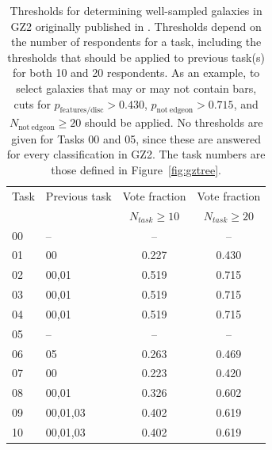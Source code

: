 \begin{table}[t]
\centering
 \begin{tabular*}{\textwidth}{l@{\extracolsep{\fill}}lcc}
 \hline
\multicolumn{1}{l}{Task} &
\multicolumn{1}{l}{Previous task} &
\multicolumn{1}{c}{Vote fraction} &
\multicolumn{1}{c}{Vote fraction}
\\ 
\multicolumn{1}{l}{} &
\multicolumn{1}{l}{} &
\multicolumn{1}{c}{$N_{task}\geq10$} &
\multicolumn{1}{c}{$N_{task}\geq20$}
\\ 
\hline					
00                      & --        & --        & --        \\
01                      & 00        & 0.227     & 0.430     \\
02                      & 00,01     & 0.519     & 0.715     \\
03                      & 00,01     & 0.519     & 0.715     \\
04                      & 00,01     & 0.519     & 0.715     \\
05                      & --        & --        & --        \\
06                      & 05        & 0.263     & 0.469     \\
07                      & 00        & 0.223     & 0.420     \\
08                      & 00,01     & 0.326     & 0.602     \\
09                      & 00,01,03  & 0.402     & 0.619     \\
10                      & 00,01,03  & 0.402     & 0.619     \\
\hline
\end{tabular*}
\caption[Thresholds for selecting sub-samples of galaxies using GZ2 data]{Thresholds for determining well-sampled galaxies in GZ2 originally published in \cite{GZ2}. Thresholds depend on the number of respondents for a task, including the thresholds that should be applied to previous task(s) for both 10 and 20 respondents. As an example, to select galaxies that may or may not contain bars, cuts for $p_\mathrm{features/disc}>0.430$, $p_\mathrm{not~edgeon}>0.715$, and $N_\mathrm{not~edgeon}\geq20$ should be applied. No thresholds are given for Tasks 00 and 05, since these are answered for every classification in GZ2. The task numbers are those defined in Figure~\ref{fig:gztree}.}
\label{table:votes}
\end{table}

